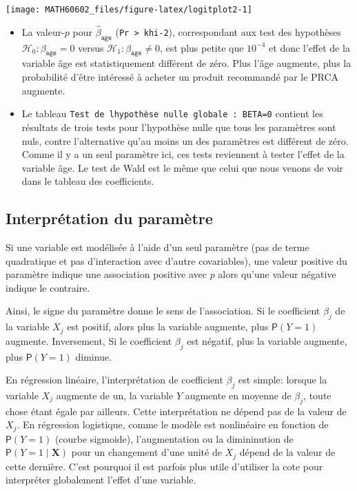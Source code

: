 \documentclass[
  11pt,
  letterpaper,
]{book}
\providecommand{\tightlist}{%
  \setlength{\itemsep}{0pt}\setlength{\parskip}{0pt}}
\theoremstyle{definition}
\theoremstyle{definition}
\theoremstyle{definition}
\theoremstyle{definition}
\theoremstyle{remark}
\begin{document}
\begin{center}\texttt{[image: MATH60602\_files/figure-latex/logitplot2-1]} \end{center}

\begin{itemize}
\tightlist
\item
  La valeur-\(p\) pour \(\widehat{\beta}_{\texttt{age}}\) (\texttt{Pr\ \textgreater{}\ khi-2}), correspondant aux test des hypothèses \(\mathcal{H}_0: \beta_{\texttt{age}}=0\) versus \(\mathcal{H}_1: \beta_{\texttt{age}} \neq 0\), est plus petite que \(10^{-4}\) et donc l'effet de la variable âge est statistiquement différent de zéro. Plus l'âge augmente, plus la probabilité d'être intéressé à acheter un produit recommandé par le PRCA augmente.
\item
  Le tableau \texttt{Test\ de\ l\textquotesingle{}hypothèse\ nulle\ globale\ :\ BETA=0} contient les résultats de trois tests pour l'hypothèse nulle que tous les paramètres sont nuls, contre l'alternative qu'au moins un des paramètres est différent de zéro. Comme il y a un seul paramètre ici, ces tests reviennent à tester l'effet de la variable âge. Le test de Wald est le même que celui que nous venons de voir dans le tableau des coefficients.
\end{itemize}

\hypertarget{interpruxe9tation-du-paramuxe8tre}{%
\subsection{Interprétation du paramètre}\label{interpruxe9tation-du-paramuxe8tre}}

Si une variable est modélisée à l'aide d'un seul paramètre (pas de terme quadratique et pas d'interaction avec d'autre covariables), une valeur positive du paramètre indique une association positive avec \(p\) alors qu'une valeur négative indique le contraire.

Ainsi, le signe du paramètre donne le sens de l'association. Si le coefficient \(\beta_j\) de la variable \(X_j\) est positif, alors plus la variable augmente, plus \({\mathsf P}\left(Y=1\right)\) augmente. Inversement, Si le coefficient \(\beta_j\) est négatif, plus la variable augmente, plus \({\mathsf P}\left(Y=1\right)\) diminue.

En régression linéaire, l'interprétation de coefficient \(\beta_j\) est simple: lorsque la variable \(X_j\) augmente de un, la variable \(Y\) augmente en moyenne de \(\beta_j\), toute chose étant égale par ailleurs. Cette interprétation ne dépend pas de la valeur de \(X_j\). En régression logistique, comme le modèle est nonlinéaire en fonction de \({\mathsf P}\left(Y=1\right)\) (courbe sigmoide), l'augmentation ou la dimininution de \({\mathsf P}\left(Y=1\mid \boldsymbol{X}\right)\) pour un changement d'une unité de \(X_j\) dépend de la valeur de cette dernière. C'est pourquoi il est parfois plus utile d'utiliser la cote pour interpréter globalement l'effet d'une variable.
\end{document}
